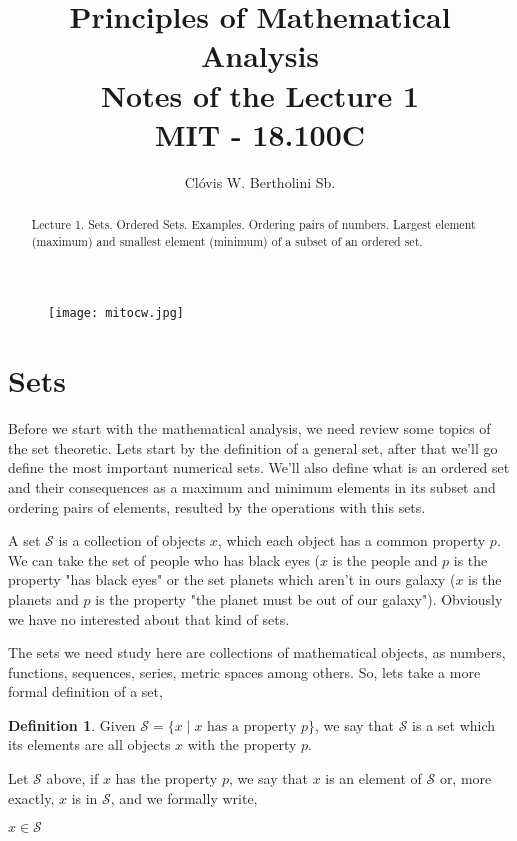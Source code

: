 \documentclass[11pt, a4paper]{amsart}
\title{Principles of Mathematical Analysis\\Notes of the Lecture 1\\MIT - 18.100C}
\author{Clóvis W. Bertholini Sb.}
\numberwithin{equation}{section}
\theoremstyle{plain} %
\theoremstyle{definition}
\newtheorem{defn}{Definition}[section]
\theoremstyle{remark}
\begin{document}
\begin{figure}[h]
\texttt{[image: mitocw.jpg]}
\end{figure}

\maketitle

\begin{abstract}
Lecture 1. Sets. Ordered Sets. Examples. Ordering pairs of numbers. Largest element (maximum) and smallest element (minimum) of a subset of an ordered set.
\end{abstract}

\section{Sets}
Before we start with the mathematical analysis, we need review some topics of the set theoretic. Lets start by the definition of a general set, after that we'll go define the most important numerical sets. We'll also define what is an ordered set and their consequences as a maximum and minimum elements in its subset and ordering pairs of elements, resulted by the operations with this sets.

A set $\mathcal{S}$ is a collection of objects $x$, which each object has a common property $p$. 
We can take the set of people who has black eyes ($x$ is the people and $p$ is the property "has black eyes" or the set planets which aren't in ours galaxy ($x$ is the planets and $p$ is the property "the planet must be out of our galaxy"). Obviously we have no interested about that kind of sets.

The sets we need study here are collections of mathematical objects, as numbers, functions, sequences, series, metric spaces among others. So, lets take a more formal definition of a set,

\begin{defn}
    Given $\mathcal{S}=\lbrace x\mid x \text{ has a property } p\rbrace$, we say that $\mathcal{S}$ is a set which its elements are all objects $x$ with the property $p$.
\end{defn}

Let $\mathcal{S}$ above, if $x$ has the property $p$, we say that $x$ is an element of $\mathcal{S}$ or, more exactly, $x$ is in $\mathcal{S}$, and we formally write,
\begin{center}
    $x\in\mathcal{S}$
\end{center}
\end{document}
